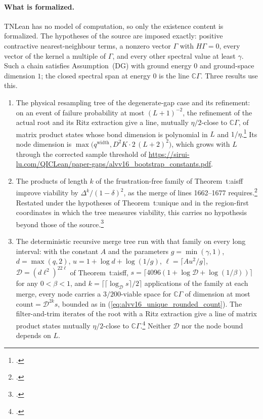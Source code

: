 \documentclass{article}
\begin{document}
\paragraph{What is formalized.}
TNLean has no model of computation, so only the existence content is
formalized. The hypotheses of the source are imposed exactly: positive
contractive nearest-neighbour terms, a nonzero vector $\Gamma$ with
$H\Gamma=0$, every vector of the kernel a multiple of $\Gamma$, and every
other spectral value at least $\gamma$. Such a chain satisfies
Assumption~(DG) with ground energy $0$ and ground-space dimension $1$; the
closed spectral span at energy $0$ is the line $\mathbb C\Gamma$. Three
results use this.
\begin{enumerate}
    \item The physical resampling tree of the degenerate-gap case and its
          refinement: on an event of failure probability at most $(L+1)^{-2}$,
          the refinement of the actual root and its Ritz extraction give a line,
          mutually $\eta/2$-close to $\mathbb C\Gamma$, of matrix product states
          whose bond dimension is polynomial in $L$ and
          $1/\eta$.\footnote{.}
          Its node dimension is
          $\max\bigl(q^{\mathrm{width}},D^2K\cdot2\,(L+2)^2\bigr)$, which grows
          with $L$ through the corrected sample threshold of
          \url{https://sirui-lu.com/QICLean/paper-gaps/alvv16_bootstrap_constants.pdf}.
    \item The products of length $k$ of the frustration-free family of
          Theorem~t:aisff improve viability by $\Delta^k/(1-\delta)^2$, as the
          merge of lines 1662--1677
          requires.\footnote{.}
          Restated under the hypotheses of Theorem~t:unique and in the
          region-first coordinates in which the tree measures viability, this
          carries no hypothesis beyond those of the
          source.\footnote{.}
    \item The deterministic recursive merge tree run with that family on every
          long interval: with the constant $A$ and the parameters
          $g=\min(\gamma,1)$, $d=\max(q,2)$, $u=1+\log d+\log(1/g)$,
          $\ell=\lceil Au^2/g\rceil$, $\mathcal D=(d\ell^2)^{22\ell}$ of
          Theorem~t:aisff,
          $s=\lceil4096(1+\log\mathcal D+\log(1/\beta))\rceil$ for any
          $0<\beta<1$, and $k=\lceil\lceil\log_{\mathcal D}s\rceil/2\rceil$
          applications of the family at each merge, every node carries a
          $3/200$-viable space for $\mathbb C\Gamma$ of dimension at most
          $\mathrm{count}=\mathcal D^{2k}s$, bounded as in
          (\ref{eq:alvv16_unique_rounded_count}). The filter-and-trim
          iterates of the root with a Ritz extraction give a line of matrix
          product states mutually $\eta/2$-close to
          $\mathbb C\Gamma$.\footnote{.}
          Neither $\mathcal D$ nor the node bound depends on $L$.
\end{enumerate}
\end{document}
